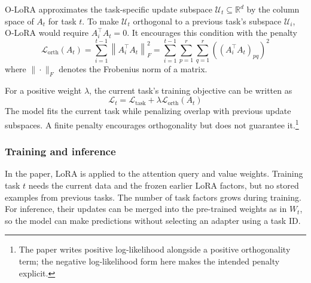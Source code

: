 O-LoRA approximates the task-specific update subspace \(\mathcal U_t \subseteq \mathbb{R}^{d}\) by the column space of \(A_t\) for task \(t\). To make \(\mathcal{U}_t\) orthogonal to a previous task's subspace \(\mathcal{U}_i\), O-LoRA would require \(A_i^{\top}A_t=0\). It encourages this condition with the penalty
\[
	\mathcal{L}_{\mathrm{orth}}(A_t)
	= \sum_{i=1}^{t-1} \left\|A_i^{\top} A_t\right\|_F^2
	= \sum_{i=1}^{t-1} \sum_{p=1}^{r}\sum_{q=1}^{r} \left((A_i^{\top} A_t)_{pq}\right)^2
\]
where \(\|\cdot\|_F\) denotes the Frobenius norm of a matrix.

For a positive weight \(\lambda\), the current task's training objective can be written as
\[
	\mathcal{L}_t =
	\mathcal{L}_{\mathrm{task}}
	+ \lambda \mathcal{L}_{\mathrm{orth}}(A_t)
\]
The model fits the current task while penalizing overlap with previous update subspaces. A finite penalty encourages orthogonality but does not guarantee it.\footnote{The paper writes positive log-likelihood alongside a positive orthogonality term; the negative log-likelihood form here makes the intended penalty explicit.}

\subsubsection{Training and inference}

In the paper, LoRA is applied to the attention query and value weights. Training task \(t\) needs the current data and the frozen earlier LoRA factors, but no stored examples from previous tasks. The number of task factors grows during training. For inference, their updates can be merged into the pre-trained weights as in \(W_t\), so the model can make predictions without selecting an adapter using a task ID.
